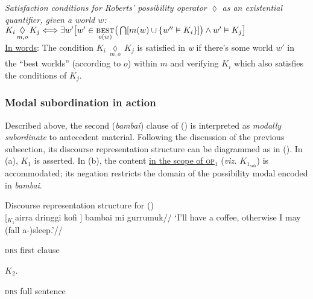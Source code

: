 \ex{}\emph{Satisfaction conditions for Roberts' possibility operator $ \lozenge $ as an existential quantifier, given a world $ w $:\\} 
$K_i\,\underset{m,o}{\lozenge}\,K_j \Longleftrightarrow\exists w'\big[w'\in\underset{o(w)}{\textsc{best}}\big(\bigcap[m(w)\cup\{w''\vDash K_i\}]\big) \wedge w'\vDash K_j\big]$\\[6pt]
\underline{In words}: The condition $K_i\,\underset{m,o}{\lozenge}\,K_j$ is satisfied in \textit{w} if there's some world $ w' $ in the ``best worlds'' (according to $ o $) within $ m $ and verifying $ K_i $ which also satisfies the conditions of $ K_j $.\xe

\subsubsection{Modal subordination in action}

Described above, the second (\textit{bambai}) clause of () is interpreted as \textit{modally subordinate} to antecedent material. Following the discussion of the previous subsection, its discourse representation structure can be diagrammed as in (\nextx). In (a), $ K_1 $ is asserted. In (b), the content \ul{in the scope of \textsc{op}$ _1 $} (\textit{viz.} $ \mathit{K_{1_{\text{sub}}}} $) is accommodated; its negation restricts the domain of the possibility modal encoded in \textit{bambai}.

\pex[labeltype=numeric,labelformat=$\mathit K_A.$]{} Discourse representation structure for ()\\
\begingl\gla{} \textup{[$ _\mathit{K_1} $}airra dringgi kofi \textup{]} bambai mi gurrumuk//
\glft`I'll have a coffee, otherwise I may (fall a-)sleep.'//\endgl{}\\
\a \begin{minipage}[t]{.3\textwidth}\textsc{drs} first clause\\


\end{minipage}$ \mathit{K_2} $.\quad\begin{minipage}[t]{.3\textwidth}\textsc{drs} full sentence\\
	 	
	 \end{minipage}


